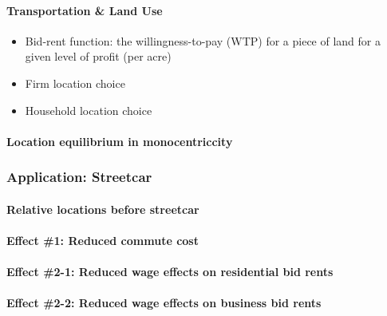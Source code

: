 \documentclass[]{article}
\let\oldparagraph\paragraph
\renewcommand{\paragraph}[1]{\oldparagraph{#1}\mbox{}}
\begin{document}
\hypertarget{transportation-land-use}{%
\paragraph{Transportation \& Land Use}\label{transportation-land-use}}

\begin{itemize}
\item
  Bid-rent function: the willingness-to-pay (WTP) for a piece of land
  for a given level of profit (per acre)
\item
  Firm location choice
\item
  Household location choice
\end{itemize}

\hypertarget{location-equilibrium-in-monocentriccity}{%
\paragraph{Location equilibrium in
monocentriccity}\label{location-equilibrium-in-monocentriccity}}

\hypertarget{application-streetcar}{%
\subsubsection{Application: Streetcar}\label{application-streetcar}}

\hypertarget{relative-locations-before-streetcar}{%
\paragraph{Relative locations before
streetcar}\label{relative-locations-before-streetcar}}

\hypertarget{effect-1-reduced-commute-cost}{%
\paragraph{Effect \#1: Reduced commute
cost}\label{effect-1-reduced-commute-cost}}

\hypertarget{effect-2-1-reduced-wage-effects-on-residential-bid-rents}{%
\paragraph{Effect \#2-1: Reduced wage effects on residential bid
rents}\label{effect-2-1-reduced-wage-effects-on-residential-bid-rents}}

\hypertarget{effect-2-2-reduced-wage-effects-on-business-bid-rents}{%
\paragraph{Effect \#2-2: Reduced wage effects on business bid
rents}\label{effect-2-2-reduced-wage-effects-on-business-bid-rents}}
\end{document}
